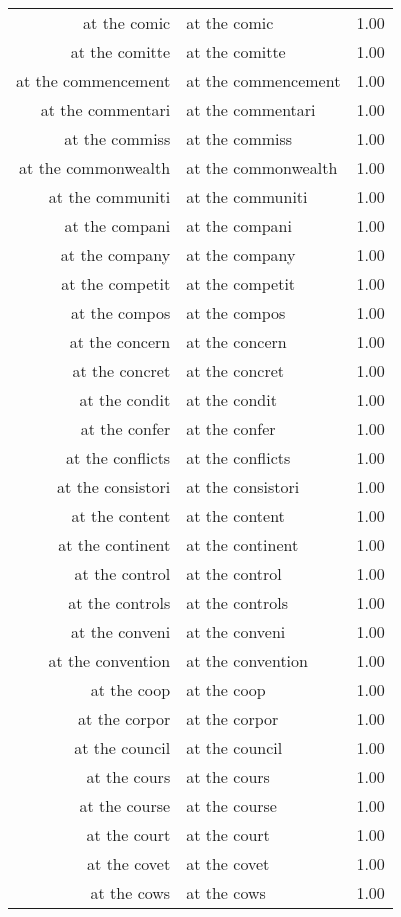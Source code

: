 \begin{table}[ht]
\begin{tabular}{rlr}
  at the comic & at the comic & 1.00 \\ 
  at the comitte & at the comitte & 1.00 \\ 
  at the commencement & at the commencement & 1.00 \\ 
  at the commentari & at the commentari & 1.00 \\ 
  at the commiss & at the commiss & 1.00 \\ 
  at the commonwealth & at the commonwealth & 1.00 \\ 
  at the communiti & at the communiti & 1.00 \\ 
  at the compani & at the compani & 1.00 \\ 
  at the company & at the company & 1.00 \\ 
  at the competit & at the competit & 1.00 \\ 
  at the compos & at the compos & 1.00 \\ 
  at the concern & at the concern & 1.00 \\ 
  at the concret & at the concret & 1.00 \\ 
  at the condit & at the condit & 1.00 \\ 
  at the confer & at the confer & 1.00 \\ 
  at the conflicts & at the conflicts & 1.00 \\ 
  at the consistori & at the consistori & 1.00 \\ 
  at the content & at the content & 1.00 \\ 
  at the continent & at the continent & 1.00 \\ 
  at the control & at the control & 1.00 \\ 
  at the controls & at the controls & 1.00 \\ 
  at the conveni & at the conveni & 1.00 \\ 
  at the convention & at the convention & 1.00 \\ 
  at the coop & at the coop & 1.00 \\ 
  at the corpor & at the corpor & 1.00 \\ 
  at the council & at the council & 1.00 \\ 
  at the cours & at the cours & 1.00 \\ 
  at the course & at the course & 1.00 \\ 
  at the court & at the court & 1.00 \\ 
  at the covet & at the covet & 1.00 \\ 
  at the cows & at the cows & 1.00 \\ 

\end{tabular}
\end{table}

